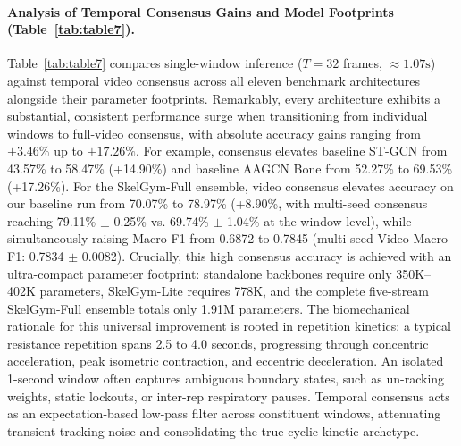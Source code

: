 \documentclass[preprint,12pt]{elsarticle}
\begin{document}
\paragraph{Analysis of Temporal Consensus Gains and Model Footprints (Table~\ref{tab:table7}).} Table~\ref{tab:table7} compares single-window inference ($T=32$ frames, $\approx 1.07\text{s}$) against temporal video consensus across all eleven benchmark architectures alongside their parameter footprints. Remarkably, every architecture exhibits a substantial, consistent performance surge when transitioning from individual windows to full-video consensus, with absolute accuracy gains ranging from $+3.46\%$ up to $+17.26\%$. For example, consensus elevates baseline ST-GCN from 43.57\% to 58.47\% (+14.90\%) and baseline AAGCN Bone from 52.27\% to 69.53\% (+17.26\%). For the SkelGym-Full ensemble, video consensus elevates accuracy on our baseline run from 70.07\% to 78.97\% (+8.90\%, with multi-seed consensus reaching 79.11\% $\pm$ 0.25\% vs. 69.74\% $\pm$ 1.04\% at the window level), while simultaneously raising Macro F1 from 0.6872 to 0.7845 (multi-seed Video Macro F1: 0.7834 $\pm$ 0.0082). Crucially, this high consensus accuracy is achieved with an ultra-compact parameter footprint: standalone backbones require only 350K--402K parameters, SkelGym-Lite requires 778K, and the complete five-stream SkelGym-Full ensemble totals only 1.91M parameters. The biomechanical rationale for this universal improvement is rooted in repetition kinetics: a typical resistance repetition spans 2.5 to 4.0 seconds, progressing through concentric acceleration, peak isometric contraction, and eccentric deceleration. An isolated 1-second window often captures ambiguous boundary states, such as un-racking weights, static lockouts, or inter-rep respiratory pauses. Temporal consensus acts as an expectation-based low-pass filter across constituent windows, attenuating transient tracking noise and consolidating the true cyclic kinetic archetype.
\end{document}
